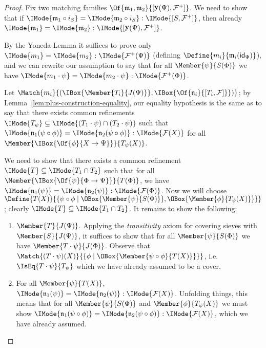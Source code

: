 \documentclass{article}
\DeclareMathOperator\OpYoneda{\mathbf{y}}
\newcommand\Yoneda[1]{\OpYoneda({#1})}
\newcommand\IsSubsetEq[2]{\IMode{#1}\subseteq\IMode{#2}}
\newcommand\ArrId[1]{\mathsf{id}_{#1}}
\newcommand\Plus[1]{{#1}^+}
\newcommand\MkSet[1]{\{#1\}}
\newcommand\IsEqOf[3]{\IMode{#1}=\IMode{#2}:\IMode{#3}}
\begin{document}
\begin{proof}
  Fix two matching families
  $\Of{\mathfrak{m}_1,\mathfrak{m}_2}{[\Yoneda{\Psi},\Plus{\mathcal{F}}]}$. We
  need to show that if
  $\IsEqOf{\mathfrak{m}_1\circ i_S}{\mathfrak{m}_2\circ
    i_S}{[S,\Plus{\mathcal{F}}]}$, then already
  $\IsEqOf{\mathfrak{m}_1}{\mathfrak{m}_2}{[\Yoneda{\Psi},\Plus{\mathcal{F}}]}$.
  
  By the Yoneda Lemma it suffices to prove only
  $\IsEqOf{m_1}{m_2}{\Plus{\mathcal{F}}(\Psi)}$ (defining
  $\Define{m_i}{\mathfrak{m}_i(\ArrId{\Psi})}$), and we can rewrite
  our assumption to say that for all $\Member{\psi}{S(\Phi)}$ we have
  $\IsEqOf{m_1\cdot\psi}{m_2\cdot\psi}{\Plus{\mathcal{F}}(\Phi)}$.

  Let
  $\Match{m_i}{(\IBox{\Member{T_i}{J(\Psi)}},\IBox{\Of{\mathfrak{n}_i}{[T_i,\mathcal{F}]}})}$;
  by Lemma~\ref{lem:plus-construction-equality}, our equality
  hypothesis is the same as to say that there exists common
  refinements $\IsSubsetEq{T_\psi}{(T_1\cdot\psi)\cap (T_2\cdot\psi)}$
  such that
  $\IsEqOf{\mathfrak{n}_1(\psi\circ\phi)}{\mathfrak{n}_2(\psi\circ\phi)}{\mathcal{F}(X)}$
  for all $\Member{\IBox{\Of{\phi}{X\to\Psi}}}{T_\psi(X)}$.

  We need to show that there exists a common refinement
  $\IsSubsetEq{T}{T_1\cap T_2}$ such that for all
  $\Member{\IBox{\Of{\psi}{\Phi\to\Psi}}}{T(\Phi)}$, we have
  $\IsEqOf{\mathfrak{n}_1(\psi)}{\mathfrak{n}_2(\psi)}{\mathcal{F}(\Phi)}$. Now
  we will choose
  $\Define{T(X)}{\MkSet{\psi \circ \phi \mid
      \OBox{\Member{\psi}{S(\Phi)}}, \OBox{\Member{\phi}{T_\psi(X)}}}}$;
  clearly $\IsSubsetEq{T}{T_1\cap T_2}$. It remains to show the
  following:
  \begin{enumerate}
  \item $\Member{T}{J(\Psi)}$. Applying the \emph{transitivity} axiom
    for covering sieves with $\Member{S}{J(\Psi)}$, it suffices to
    show that for all $\Member{\psi}{S(\Phi)}$ we have
    $\Member{T\cdot\psi}{J(\Phi)}$. Observe that
    $\Match{(T\cdot\psi)(X)}{\MkSet{\phi\mid
        \OBox{\Member{\psi\circ\phi}{T(X)}}}}$, i.e.\
    $\IsEq{T\cdot\psi}{T_\psi}$ which we have already assumed to be a
    cover.

  \item For all $\Member{\psi}{T(X)}$,
    $\IsEqOf{\mathfrak{n}_1(\psi)}{\mathfrak{n}_2(\psi)}{\mathcal{F}(X)}$. Unfolding
    things, this means that for all $\Member{\psi}{S(\Phi)}$ and
    $\Member{\phi}{T_\psi(X)}$ we must show
    $\IsEqOf{\mathfrak{n}_1(\psi\circ\phi)}{\mathfrak{n}_2(\psi\circ\phi)}{\mathcal{F}(X)}$,
    which we have already assumed.
  \end{enumerate}

\end{proof}
\end{document}
